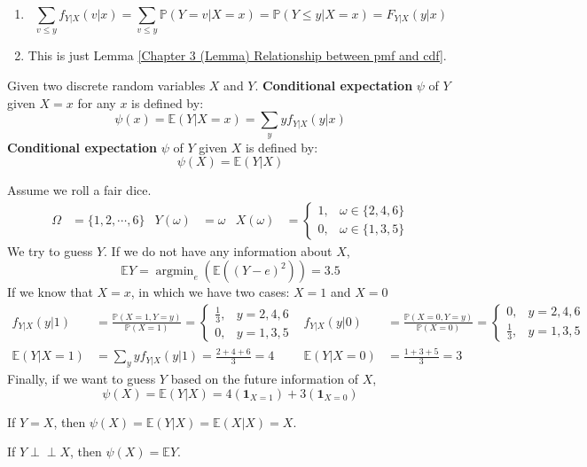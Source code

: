 \documentclass{huhtakm-template-book}
\newcommand{\independent}{\perp\!\!\!\perp}
\newcommand{\prob}{\mathbb{P}}
\newcommand{\expect}{\mathbb{E}}
\DeclareMathOperator*{\argmin}{argmin}
\begin{document}
\begin{proofing}
	\begin{enumerate}
		\item 
		\begin{equation*}
			\sum_{v\leq y}f_{Y|X}(v|x)=\sum_{v\leq y}\prob(Y=v|X=x)=\prob(Y\leq y|X=x)=F_{Y|X}(y|x)
		\end{equation*}
		\item 
		This is just Lemma \ref{Chapter 3 (Lemma) Relationship between pmf and cdf}.
	\end{enumerate}
\end{proofing}
\begin{defn}
	Given two discrete random variables $X$ and $Y$. \textbf{Conditional expectation} $\psi$ of $Y$ given $X=x$ for any $x$ is defined by:
	\begin{equation*}
		\psi(x)=\expect(Y|X=x)=\sum_{y}yf_{Y|X}(y|x)
	\end{equation*}
	\textbf{Conditional expectation} $\psi$ of $Y$ given $X$ is defined by:
	\begin{equation*}
		\psi(X)=\expect(Y|X)
	\end{equation*}
\end{defn}
\begin{eg}
	Assume we roll a fair dice.
	\begin{align*}
		\Omega&=\{1,2,\cdots,6\} & Y(\omega)&=\omega & X(\omega)&=\begin{cases}
			1, &\omega\in\{2,4,6\}\\
			0, &\omega\in\{1,3,5\}
		\end{cases}
	\end{align*}
	We try to guess $Y$. If we do not have any information about $X$, 
	\begin{equation*}
		\expect Y=\argmin_{e}(\expect((Y-e)^{2}))=3.5
	\end{equation*}
	If we know that $X=x$, in which we have two cases: $X=1$ and $X=0$
	\begin{align*}
		f_{Y|X}(y|1)&=\frac{\prob(X=1,Y=y)}{\prob(X=1)}=\begin{cases}
			\frac{1}{3}, &y=2,4,6\\
			0, &y=1,3,5
		\end{cases} & f_{Y|X}(y|0)&=\frac{\prob(X=0,Y=y)}{\prob(X=0)}=\begin{cases}
			0, &y=2,4,6\\
			\frac{1}{3}, &y=1,3,5
		\end{cases}\\
		\expect(Y|X=1)&=\sum_{y}yf_{Y|X}(y|1)=\frac{2+4+6}{3}=4 & \expect(Y|X=0)&=\frac{1+3+5}{3}=3
	\end{align*}
	Finally, if we want to guess $Y$ based on the future information of $X$,
	\begin{equation*}
		\psi(X)=\expect(Y|X)=4(\mathbf{1}_{X=1})+3(\mathbf{1}_{X=0})
	\end{equation*}
\end{eg}
\begin{eg}
	If $Y=X$, then $\psi(X)=\expect(Y|X)=\expect(X|X)=X$.
\end{eg}
\begin{eg}
	If $Y\independent X$, then $\psi(X)=\expect Y$.
\end{eg}
\end{document}
